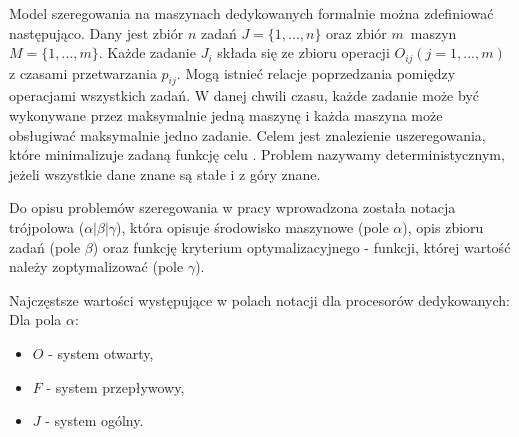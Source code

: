 \documentclass[brudnopis]{xmgr}
\begin{document}
Model szeregowania na maszynach dedykowanych formalnie można zdefiniować następująco. Dany jest zbiór $n$ zadań $J=\{1, ..., n\}$ oraz zbiór $m$~maszyn $M=\{1, ..., m\}$.
Każde zadanie $J_i$ składa się ze zbioru operacji $O_{ij} (j=1, ..., m)$ z czasami przetwarzania $p_{ij}$.
Mogą istnieć relacje poprzedzania pomiędzy operacjami wszystkich zadań.
W danej chwili czasu, każde zadanie może być wykonywane przez maksymalnie jedną maszynę i każda maszyna może obsługiwać maksymalnie jedno zadanie.
Celem jest znalezienie uszeregowania, które minimalizuje zadaną funkcję celu \cite{brucker2007scheduling}. Problem nazywamy deterministycznym, jeżeli wszystkie dane znane są stałe i z góry znane.


Do opisu problemów szeregowania w pracy \cite{graham1979optimization} wprowadzona została notacja trójpolowa ($\alpha|\beta|\gamma$), która opisuje środowisko maszynowe (pole $\alpha$), opis zbioru zadań (pole $\beta$) oraz funkcję kryterium optymalizacyjnego - funkcji, której wartość należy zoptymalizować (pole $\gamma$).\\
\newpage

Najczęstsze wartości występujące w polach notacji dla procesorów dedykowanych:\\

Dla pola $\alpha$:
\begin{itemize}
    \item $O$ - system otwarty,
    \item $F$ - system przepływowy,
    \item $J$ - system ogólny.
\end{itemize}
\end{document}

